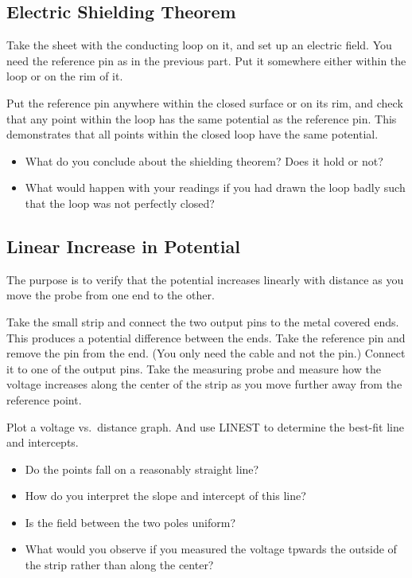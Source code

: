 \subsection{Electric Shielding Theorem}

Take the sheet with the conducting loop on it, and set up an electric field. You need the reference pin as in the previous part. Put it somewhere either within the loop or on the rim of it.\myskip

Put the reference pin anywhere within the closed surface or on its rim, and check that any point within the loop has the same potential as the reference pin. This demonstrates that all points within the closed loop have the same potential.
\begin{itemize}
    \item What do you conclude about the shielding theorem? Does it hold or not?
    \item What would happen with your readings if you had drawn the loop badly such that the loop was not perfectly closed?
\end{itemize}

\subsection{Linear Increase in Potential}

The purpose is to verify that the potential increases linearly with distance as you move the probe from one end to the other.\myskip

Take the small strip and connect the two output pins to the metal covered ends. This produces a potential difference between the ends. Take the reference pin and remove the pin from the end. (You only need the cable and not the pin.) Connect it to one of the output pins. Take the measuring probe and measure how the voltage increases along the center of the strip as you move further away from the reference point.\myskip

Plot a voltage vs.\ distance graph. And use LINEST to determine the best-fit line and intercepts.
\begin{itemize}
    \item Do the points fall on a reasonably straight line?
    \item How do you interpret the slope and intercept of this line?
    \item Is the field between the two poles uniform?
    \item What would you observe if you measured the voltage tpwards the outside of the strip rather than along the center?
\end{itemize}


